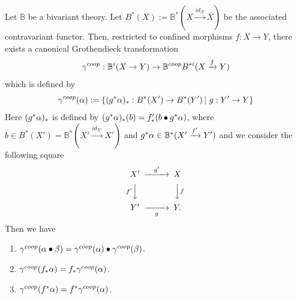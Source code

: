 \documentclass[a4paper]{amsart}
\begin{document}
\begin{pro} Let $\mathbb B$ be a bivariant theory. Let $B^*(X):=\mathbb B^*(X \xrightarrow {id_X} X)$ be the associated contravariant functor. Then, restricted to confined morphisms $f:X \to Y$, there exists a canonical Grothendieck transformation
$$\gamma^{coop}: \mathbb B^i(X \to Y) \to \mathbb B^{coop}B^{* i}(X \xrightarrow f Y )$$ 
which is defined by
$$\gamma^{coop} (\alpha) := \left \{ (g^*\alpha)_*:B^*(X') \to B^*(Y') \, | \, \, g:Y' \to Y \right \}$$
Here $(g^*\alpha)_*$ is defined by $(g^*\alpha)_*(b)= f'_*(b \bullet g^*\alpha)$, where $b \in B^*(X')=\mathbb B^*(X' \xrightarrow {id_{X'}} X')$ and $g^*\alpha \in \mathbb B^*(X' \xrightarrow {f'} Y')$ and we consider the following square
$$\CD
X' @> {g'}  >> X\\
@V {f'} VV @VV fV\\
Y' @>> {g} > Y.\\
\endCD
$$
Then we have
\begin{enumerate}
\item $\gamma^{coop} (\alpha \bullet \beta)= \gamma^{coop}(\alpha) \bullet \gamma^{coop}(\beta)$.
\item $\gamma^{coop} (f_*\alpha)= f_*\gamma^{coop}(\alpha)$.
\item $\gamma^{coop} (f^*\alpha)= f^*\gamma^{coop}(\alpha)$.
\end{enumerate}
\end{pro}
\end{document}
